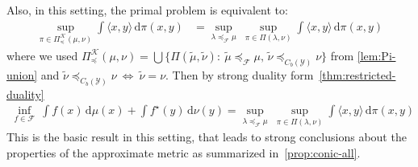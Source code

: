 \documentclass[10pt]{article}
\newcommand{\ud}{\,\mathrm{d}}
\renewcommand{\tilde}{\widetilde}
\newcommand{\calF}{\mathcal{F}}
\newcommand{\calK}{\mathcal{K}}
\newcommand{\calY}{\mathcal{Y}}
\numberwithin{equation}{section}
\begin{document}
Also, in this setting, the primal problem is equivalent to:
\begin{align*}
\sup_{\pi \in \Pi^\calK_\preceq(\mu,\nu)} \int \langle x,y \rangle\ud \pi(x,y)&= \sup_{\lambda \preceq_{\calF}\mu } ~\sup_{\pi \in \Pi(\lambda,\nu)} \int \langle x,y \rangle \ud \pi(x,y)
\end{align*}
where we used $ \Pi_\preceq^\calK(\mu,\nu) =\bigcup \bigl\{ \Pi(\tilde{\mu},\tilde{\nu}) :~ \tilde{\mu}\preceq_\calF \mu,\,\tilde{\nu}\preceq_{C_b(\calY)} \nu \bigr\}$ from \autoref{lem:Pi-union} and $\tilde{\nu}\preceq_{C_b(\calY)} \nu ~\Leftrightarrow~\tilde{\nu} = \nu$. Then by strong duality form~\autoref{thm:restricted-duality}
\begin{align*}
\inf_{f \in \calF }~\int f(x) \ud \mu(x) + \int f^\star (y)\ud \nu(y)= \sup_{\lambda \preceq_{\calF}\mu } ~\sup_{\pi \in \Pi(\lambda,\nu)} \int \langle x,y \rangle \ud \pi(x,y)
\end{align*} 
This is the basic result in this setting, that leads to strong conclusions about the properties of the approximate metric as summarized in~\autoref{prop:conic-all}. 
\end{document}
